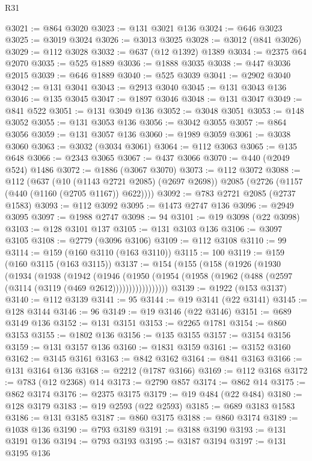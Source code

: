 \begin{lexlean}{R31}
\begin{coremodule}
@3021 := @864 @3020
@3023 := @131 @3021 @136
@3024 := @646 @3023
@3025 := @3019 @3024
@3026 := @3013 @3025
@3028 := @3012 (@841 @3026)
@3029 := @112 @3028
@3032 := @637 (@12 @1392) @1389
@3034 := @2375 @64 @2070
@3035 := @525 @1889
@3036 := @1888 @3035
@3038 := @447 @3036 @2015
@3039 := @646 @1889
@3040 := @525 @3039
@3041 := @2902 @3040
@3042 := @131 @3041
@3043 := @2913 @3040
@3045 := @131 @3043 @136
@3046 := @135 @3045
@3047 := @1897 @3046
@3048 := @131 @3047
@3049 := @841 @522
@3051 := @131 @3049 @136
@3052 := @3048 @3051
@3053 := @148 @3052
@3055 := @131 @3053 @136
@3056 := @3042 @3055
@3057 := @864 @3056
@3059 := @131 @3057 @136
@3060 := @1989 @3059
@3061 := @3038 @3060
@3063 := @3032 (@3034 @3061)
@3064 := @112 @3063
@3065 := @135 @648
@3066 := @2343 @3065
@3067 := @437 @3066
@3070 := @440 (@2049 @524) @1486
@3072 := @1886 (@3067 @3070)
@3073 := @112 @3072
@3088 := @112
    (@637
      (@10 (@1143 @2721 @2085) (@2697 @2698))
      @2085
      (@2726 (@1157 (@440 (@1160 (@2705 @1167)) @622))))
@3092 := @783 @2721 @2085 (@2737 @1583)
@3093 := @112 @3092
@3095 := @1473 @2747 @136
@3096 := @2949 @3095
@3097 := @1988 @2747
@3098 := 94
@3101 := @19 @3098 (@22 @3098)
@3103 := @128 @3101 @137
@3105 := @131 @3103 @136
@3106 := @3097 @3105
@3108 := @2779 (@3096 @3106)
@3109 := @112 @3108
@3110 := 99
@3114 := @159 (@160 @3110 (@163 @3110))
@3115 := 100
@3119 := @159 (@160 @3115 (@163 @3115))
@3137 := @154
    (@155
      (@158
        (@1926
          (@1930
            (@1934
              (@1938
                (@1942
                  (@1946
                    (@1950
                      (@1954 (@1958 (@1962 (@488 (@2597 (@3114 (@3119 (@469 @2612)))))))))))))))))
@3139 := @1922 (@153 @3137)
@3140 := @112 @3139
@3141 := 95
@3144 := @19 @3141 (@22 @3141)
@3145 := @128 @3144
@3146 := 96
@3149 := @19 @3146 (@22 @3146)
@3151 := @689 @3149 @136
@3152 := @131 @3151
@3153 := @2265 @1781
@3154 := @860 @3153
@3155 := @1802 @136
@3156 := @135 @3155
@3157 := @3154 @3156
@3159 := @131 @3157 @136
@3160 := @1831 @3159
@3161 := @3152 @3160
@3162 := @3145 @3161
@3163 := @842 @3162
@3164 := @841 @3163
@3166 := @131 @3164 @136
@3168 := @2212 (@1787 @3166)
@3169 := @112 @3168
@3172 := @783 (@12 @2368) @14
@3173 := @2790 @857
@3174 := @862 @14
@3175 := @862 @3174
@3176 := @2375 @3175
@3179 := @19 @484 (@22 @484)
@3180 := @128 @3179
@3183 := @19 @2593 (@22 @2593)
@3185 := @689 @3183 @1583
@3186 := @131 @3185
@3187 := @860 @3175
@3188 := @860 @3174
@3189 := @1038 @136
@3190 := @793 @3189
@3191 := @3188 @3190
@3193 := @131 @3191 @136
@3194 := @793 @3193
@3195 := @3187 @3194
@3197 := @131 @3195 @136

\end{coremodule}
\end{lexlean}
